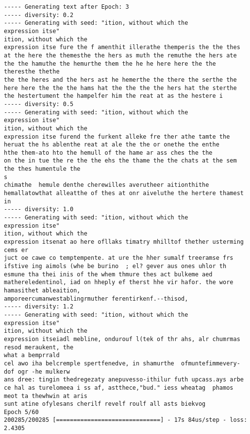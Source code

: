\documentclass[11pt]{article}
\begin{document}
\begin{Verbatim}[commandchars=\\\{\}]
----- Generating text after Epoch: 3
----- diversity: 0.2
----- Generating with seed: "ition, without which the
expression itse"
ition, without which the
expression itse fure the f amenthit illerathe themperis the the thes at the here the themesthe the hers as muth the remuthe the hers ate the the hamuthe the hemurthe them the he he here here the the theresthe thethe
the the heres and the hers ast he hemerthe the there the serthe the here here the the the hams hat the the the the hers hat the sterthe
the hestertument the hampelfer him the reat at as the hestere i
----- diversity: 0.5
----- Generating with seed: "ition, without which the
expression itse"
ition, without which the
expression itse furend the furkent alleke fre ther athe tamte the heruat the hs ablenthe reat at ale the the or onethe the enthe
hthe them-ato hto the hemull of the hame ar ass ches the the
on the in tue the re the the ehs the thame the the chats at the sem the thes humentule the
s
chimathe  hemule denthe cherewilles averutheer aitionthithe hemallatowthat alleatthe of thes at onr aiveluthe the hertere thamest in
----- diversity: 1.0
----- Generating with seed: "ition, without which the
expression itse"
ition, without which the
expression itsenat ao here ofllaks timatry mhilltof thether usterming cems er
juct oe cawe co temptempente. at ure the hher sumalf treeramse frs ifstive ing aimols (whe be burino  ; el? gever aus ones uhlor th esmune tha thei inis of the whem thmure thes act bulkeme aed
mathereledentinol, iad on hheply ef therst hhe vir hafor. the wore hamasithet ableaition,
amporeercumanwestablingrmuther ferentirkenf.--thisod, 
----- diversity: 1.2
----- Generating with seed: "ition, without which the
expression itse"
ition, without which the
expression itseiadl mebline, ondurouf l(tek of thr ahs, alr chumrmas resod meraukent, the
what a bemprrald
cel awo iha belcremple spertfenedve, in shamurthe  ofmuntefimmevery-dof ogr -he mulkerw
ans dree: tingin thedregezaty anepuvesso-ithilur futh upcass.ays arbe ce hal as turelomeea i ss af, astthece,"bud." iess wheatag  phamos meot ta thewhwin at aris
sunt atine ofylesans cherilf revelf roulf all asts biekvog
Epoch 5/60
200285/200285 [==============================] - 17s 84us/step - loss: 2.4305


\end{Verbatim}
\end{document}
